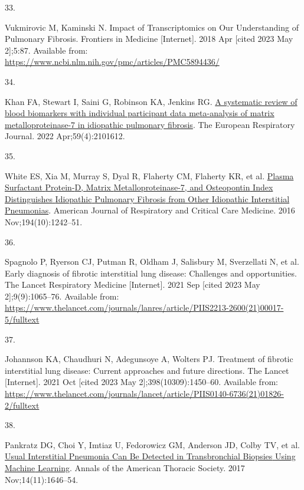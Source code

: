 \documentclass[
]{article}
\newlength{\cslhangindent}
\newlength{\csllabelwidth}
\newenvironment{CSLReferences}[2] %
 {\begin{list}{}{%
  \setlength{\itemindent}{0pt}
  \setlength{\leftmargin}{0pt}
  \setlength{\parsep}{0pt}
  \ifodd #1
   \setlength{\leftmargin}{\cslhangindent}
   \setlength{\itemindent}{-1\cslhangindent}
  \fi
  \setlength{\itemsep}{#2\baselineskip}}}
 {\end{list}}
\newcommand{\CSLLeftMargin}[1]{\parbox[t]{\csllabelwidth}{\strut#1\strut}}
\newcommand{\CSLRightInline}[1]{\parbox[t]{\linewidth - \csllabelwidth}{\strut#1\strut}}
\begin{document}
\begin{CSLReferences}{0}{1}
\CSLLeftMargin{33. }%
\CSLRightInline{Vukmirovic M, Kaminski N. Impact of {Transcriptomics} on {Our} {Understanding} of {Pulmonary} {Fibrosis}. Frontiers in Medicine {[}Internet{]}. 2018 Apr {[}cited 2023 May 2{]};5:87. Available from: \url{https://www.ncbi.nlm.nih.gov/pmc/articles/PMC5894436/}}

\CSLLeftMargin{34. }%
\CSLRightInline{Khan FA, Stewart I, Saini G, Robinson KA, Jenkins RG. \href{https://doi.org/10.1183/13993003.01612-2021}{A systematic review of blood biomarkers with individual participant data meta-analysis of matrix metalloproteinase-7 in idiopathic pulmonary fibrosis}. The European Respiratory Journal. 2022 Apr;59(4):2101612. }

\CSLLeftMargin{35. }%
\CSLRightInline{White ES, Xia M, Murray S, Dyal R, Flaherty CM, Flaherty KR, et al. \href{https://doi.org/10.1164/rccm.201505-0862OC}{Plasma {Surfactant} {Protein}-{D}, {Matrix} {Metalloproteinase}-7, and {Osteopontin} {Index} {Distinguishes} {Idiopathic} {Pulmonary} {Fibrosis} from {Other} {Idiopathic} {Interstitial} {Pneumonias}}. American Journal of Respiratory and Critical Care Medicine. 2016 Nov;194(10):1242--51. }

\CSLLeftMargin{36. }%
\CSLRightInline{Spagnolo P, Ryerson CJ, Putman R, Oldham J, Salisbury M, Sverzellati N, et al. Early diagnosis of fibrotic interstitial lung disease: Challenges and opportunities. The Lancet Respiratory Medicine {[}Internet{]}. 2021 Sep {[}cited 2023 May 2{]};9(9):1065--76. Available from: \url{https://www.thelancet.com/journals/lanres/article/PIIS2213-2600(21)00017-5/fulltext}}

\CSLLeftMargin{37. }%
\CSLRightInline{Johannson KA, Chaudhuri N, Adegunsoye A, Wolters PJ. Treatment of fibrotic interstitial lung disease: Current approaches and future directions. The Lancet {[}Internet{]}. 2021 Oct {[}cited 2023 May 2{]};398(10309):1450--60. Available from: \url{https://www.thelancet.com/journals/lancet/article/PIIS0140-6736(21)01826-2/fulltext}}

\CSLLeftMargin{38. }%
\CSLRightInline{Pankratz DG, Choi Y, Imtiaz U, Fedorowicz GM, Anderson JD, Colby TV, et al. \href{https://doi.org/10.1513/AnnalsATS.201612-947OC}{Usual {Interstitial} {Pneumonia} {Can} {Be} {Detected} in {Transbronchial} {Biopsies} {Using} {Machine} {Learning}}. Annals of the American Thoracic Society. 2017 Nov;14(11):1646--54. }


\end{CSLReferences}
\end{document}

